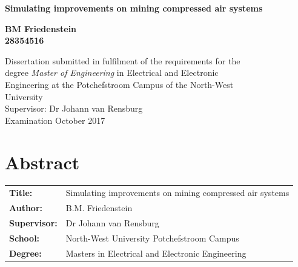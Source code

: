 \documentclass[12pt, english, oneside, open=any,draft=false ]{report}%
\begin{document}
\begin{titlepage}
	\BgThispage	
		\vspace{0cm}
		\begin{center}
			\textbf{\singlespacing\huge{Simulating improvements on mining compressed air systems}\\
			}\par
			\vspace{3cm}
			\LARGE{ \textbf{BM Friedenstein \\28354516} }
		\end{center}
	
	\vspace{2cm}
	
\begin{flushleft}
	{\singlespacing\centering \Large Dissertation submitted in fulfilment of the requirements for the \\ degree {\color{MasterBlue} \textit{Master of Engineering}} in {\color{MasterBlue}Electrical and Electronic \\ Engineering} at the Potchefstroom Campus of the North-West\\ University\\
	}
	\vspace{2cm}
	{\large \setlength{\parindent}{0.5cm} Supervisor: Dr Johann van Rensburg \\
	\vspace{1cm}
	\large{Examination October 2017}\\		
	}
\end{flushleft}
\end{titlepage}
\clearpage

{\tiny }\section*{Abstract}
	\thispagestyle{plain}
	\vspace{0.2cm}
	\begin{tabular}{p{2.35cm}p{13cm}}
		\textbf{Title:} & Simulating improvements on mining compressed air systems  \\
		\textbf{Author:} & B.M. Friedenstein \\
		\textbf{Supervisor:} & Dr Johann van Rensburg \\
		\textbf{School:} & North-West University Potchefstroom Campus\\
		\textbf{Degree:} & Masters in Electrical and Electronic Engineering \\
	\end{tabular}
	\vspace{1cm}
\end{document}
